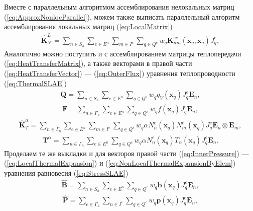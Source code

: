 Вместе с параллельным алгоритмом ассемблирования нелокальных матриц (\ref{eq:ApproxNonlocParallel}), можем также выписать параллельный алгоритм ассемблирования локальных матриц (\ref{eq:LocalMatrix})
\begin{gather*}
	\widehat{\textbf{K}}^L_{\mathcal{F}} =
	\sum\limits_{n \in S_h}
	\sum\limits_{e \in E^n}
	\sum\limits_{m \in I^e}
	\sum\limits_{q \in Q^e}
	w_q \textbf{K}^{ee}_{nm} (\boldsymbol{x}_q, \boldsymbol{x}_q) J_q^e,
\end{gather*}
Аналогично можно поступить и с ассемблированием матрицы теплопередачи (\ref{eq:HeatTransferMatrix}), а также векторами в правой части (\ref{eq:HeatTransferVector}) --- (\ref{eq:OuterFlux}) уравнения теплопроводности (\ref{eq:ThermalSLAE})
\begin{gather*}
	\textbf{Q} =
	\sum\limits_{n \in S_h}
	\sum\limits_{e \in E^n}
	\sum\limits_{q \in Q^e}
	w_q q_V (\boldsymbol{x}_q) J_q^e \boldsymbol{E}_n,
\end{gather*}
\begin{gather*}
	\textbf{F} =
	\sum\limits_{n \in \Gamma_h}
	\sum\limits_{e \in E^n}
	\sum\limits_{q \in Q^e}
	w_q f (\boldsymbol{x}_q) J_q^e \boldsymbol{E}_n,
\end{gather*}
\begin{gather*}
	\widehat{\textbf{K}}^{\alpha}_T =
	\sum\limits_{n \in \Gamma_h}
	\sum\limits_{e \in E^n}
	\sum\limits_{m \in I^{e}}
	\sum\limits_{q \in Q^e}
	w_q \alpha N_n^e (\boldsymbol{x}_q) N_m^e (\boldsymbol{x}_q) J_q^e \boldsymbol{E}_n \otimes \boldsymbol{E}_m,
\end{gather*}
\begin{gather*}
	\textbf{T}^{\alpha} =
	\sum\limits_{n \in \Gamma_h}
	\sum\limits_{e \in E^n}
	\sum\limits_{q \in Q^e}
	w_q \alpha N_n^e (\boldsymbol{x}_q) T_{\alpha} (\boldsymbol{x}_q) J_q^e \boldsymbol{E}_n.
\end{gather*}
Проделаем те же выкладки и для векторов правой части (\ref{eq:InnerPressure}) --- (\ref{eq:LocalThermalExpansion}) и (\ref{eq:NonLocalThermalExpansionByElem}) уравнения равновесия (\ref{eq:StressSLAE})
\begin{gather*}
	\widehat{\textbf{B}} =
	\sum\limits_{n \in S_h}
	\sum\limits_{e \in E^n}
	\sum\limits_{q \in Q^e}
	w_q \boldsymbol{b} (\boldsymbol{x}_q) J_q^e \boldsymbol{E}_n,
\end{gather*}
\begin{gather*}
	\widehat{\textbf{P}} = 
	\sum\limits_{e \in \Gamma_h}
	\sum\limits_{n \in I^e}
	\sum\limits_{q \in Q^e}
	w_q \boldsymbol{p} (\boldsymbol{x}_q) J_q^e \boldsymbol{E}_n,
\end{gather*}
